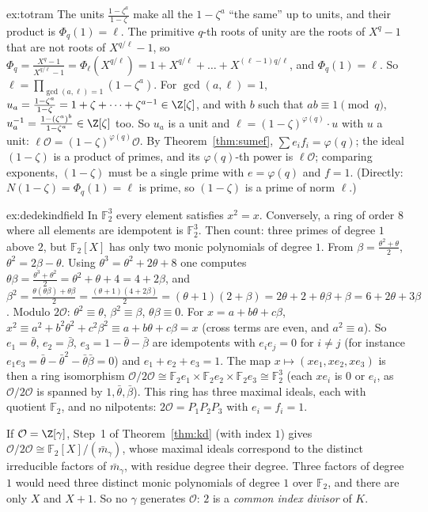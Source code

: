 \begin{solution}{ex:totram}
\idea The units $\frac{1-\zeta^a}{1-\zeta}$ make all the $1-\zeta^a$ ``the same'' up to units, and their product is
$\Phi_q(1)=\ell$.
\writeup The primitive $q$-th roots of unity are the roots of $X^{q}-1$ that are not roots of $X^{q/\ell}-1$, so $\Phi_q=
\frac{X^q-1}{X^{q/\ell}-1}=\Phi_\ell(X^{q/\ell})=1+X^{q/\ell}+\dots+X^{(\ell-1)q/\ell}$, and $\Phi_q(1)=\ell$. So
$\ell=\prod_{\gcd(a,\ell)=1}(1-\zeta^a)$. For $\gcd(a,\ell)=1$, $u_a=\frac{1-\zeta^a}{1-\zeta}=1+\zeta+\dots+\zeta^{a-1}\in
\Z[\zeta]$, and with $b$ such that $ab\equiv1\pmod q$, $u_a^{-1}=\frac{1-(\zeta^a)^b}{1-\zeta^a}\in\Z[\zeta]$ too. So
$u_a$ is a unit and $\ell=(1-\zeta)^{\varphi(q)}\cdot u$ with $u$ a unit: $\ell\mathcal O=(1-\zeta)^{\varphi(q)}\mathcal O$.
By Theorem~\ref{thm:sumef}, $\sum e_if_i=\varphi(q)$; the ideal $(1-\zeta)$ is a product of primes, and its
$\varphi(q)$-th power is $\ell\mathcal O$; comparing exponents, $(1-\zeta)$ must be a single prime with $e=\varphi(q)$ and
$f=1$. (Directly: $N(1-\zeta)=\Phi_q(1)=\ell$ is prime, so $(1-\zeta)$ is a prime of norm $\ell$.)
\end{solution}

\begin{solution}{ex:dedekindfield}
\idea In $\mathbb F_2^3$ every element satisfies $x^2=x$. Conversely, a ring of order $8$ where all elements are
idempotent is $\mathbb F_2^3$. Then count: three primes of degree $1$ above $2$, but $\mathbb F_2[X]$ has only two monic
polynomials of degree $1$.
\writeup From $\beta=\frac{\theta^2+\theta}2$, $\theta^2=2\beta-\theta$. Using $\theta^3=\theta^2+2\theta+8$ one computes
$\theta\beta=\frac{\theta^3+\theta^2}2=\theta^2+\theta+4=4+2\beta$, and $\beta^2=\frac{\theta(\theta\beta)+\theta\beta}{2}
=\frac{(\theta+1)(4+2\beta)}2=(\theta+1)(2+\beta)=2\theta+2+\theta\beta+\beta=6+2\theta+3\beta$. Modulo $2\mathcal O$:
$\theta^2\equiv\theta$, $\beta^2\equiv\beta$, $\theta\beta\equiv0$. For $x=a+b\theta+c\beta$, $x^2\equiv a^2+b^2\theta^2+
c^2\beta^2\equiv a+b\theta+c\beta=x$ (cross terms are even, and $a^2\equiv a$). So $e_1=\bar\theta$, $e_2=\bar\beta$,
$e_3=1-\bar\theta-\bar\beta$ are idempotents with $e_ie_j=0$ for $i\ne j$ (for instance $e_1e_3=\bar\theta-\bar\theta^2-
\bar\theta\bar\beta=0$) and $e_1+e_2+e_3=1$. The map $x\mapsto(xe_1,xe_2,xe_3)$ is then a ring isomorphism
$\mathcal O/2\mathcal O\cong\mathbb F_2e_1\times\mathbb F_2e_2\times\mathbb F_2e_3\cong\mathbb F_2^3$ (each $xe_i$ is $0$ or
$e_i$, as $\mathcal O/2\mathcal O$ is spanned by $1,\bar\theta,\bar\beta$). This ring has three maximal ideals, each with
quotient $\mathbb F_2$, and no nilpotents: $2\mathcal O=P_1P_2P_3$ with $e_i=f_i=1$.

If $\mathcal O=\Z[\gamma]$, Step~1 of Theorem~\ref{thm:kd} (with index $1$) gives $\mathcal O/2\mathcal O\cong\mathbb
F_2[X]/(\bar m_\gamma)$, whose maximal ideals correspond to the distinct irreducible factors of $\bar m_\gamma$, with
residue degree their degree. Three factors of degree $1$ would need three distinct monic polynomials of degree $1$ over
$\mathbb F_2$, and there are only $X$ and $X+1$. So no $\gamma$ generates $\mathcal O$: $2$ is a \emph{common index
divisor} of $K$.
\end{solution}

